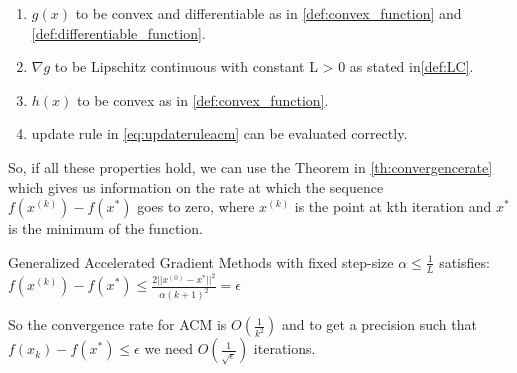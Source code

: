 \begin{enumerate}

    \item $g(x)$ to be convex and differentiable as in \ref{def:convex_function} and \ref{def:differentiable_function}.
    \item $\nabla g$ to be Lipschitz continuous with constant L > 0  as stated in\ref{def:LC}.
    \item $h(x)$ to be convex as in \ref{def:convex_function}.
    \item update rule in \ref{eq:updateruleacm} can be evaluated correctly.
\end{enumerate}



So, if all these properties hold, we can use the Theorem in \ref{th:convergencerate} which gives us information on the rate at which the sequence $f(x^{(k)}) - f(x^*)$ goes to zero, where $x^{(k)}$ is the point at kth iteration and $x^*$ is the minimum of the function.

\begin{theorem}
\label{th:convergencerate}
Generalized Accelerated Gradient Methods with fixed step-size $\alpha \leq \frac{1}{L}$ satisfies: \\
$f(x^{(k)}) - f(x^*) \leq \frac{2 || x^{(0)} - x^* ||^2}{\alpha (k+1)^2} = \epsilon$

\end{theorem}

So the convergence rate for ACM is $O(\frac{1}{k^2})$ and to get a precision such that $f(x_k) - f(x^*) \leq \epsilon$ we need $O(\frac{1}{\sqrt{\epsilon}})$ iterations.

%

